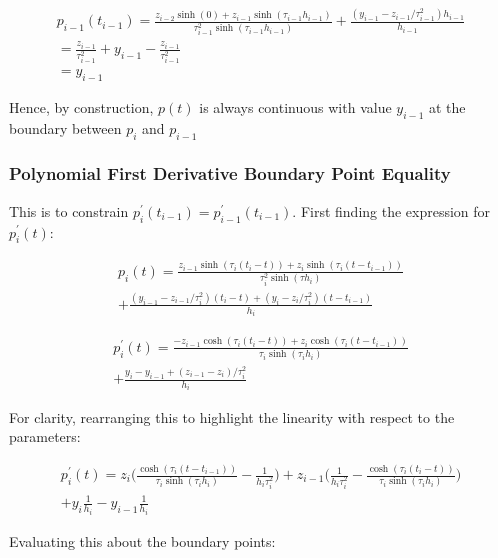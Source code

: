 \documentclass{article}
\begin{document}
\begin{eqnarray}
    \nonumber
    p_{i-1}(t_{i-1}) = \frac{z_{i-2} \sinh(0) + z_{i-1} \sinh(\tau_{i-1} h_{i-1})}{\tau_{i-1}^2 \sinh(\tau_{i-1} h_{i-1})}
    + \frac{(y_{i-1} - z_{i-1}/\tau_{i-1}^2) h_{i-1}}{h_{i-1}} \\
    \nonumber
    = \frac{z_{i-1}}{\tau_{i-1}^2} + y_{i-1} - \frac{z_{i-1}}{\tau_{i-1}^2} \\
    \nonumber
    = y_{i-1}
\end{eqnarray}

Hence, by construction, $p(t)$ is always continuous with value $y_{i-1}$ at the boundary
between $p_i$ and $p_{i - 1}$

\subsubsection{Polynomial First Derivative Boundary Point Equality}
This is to constrain $p^\prime_i(t_{i-1}) = p^\prime_{i-1}(t_{i-1})$. First finding the 
expression for $p^\prime_i(t)$:

\begin{multline}
    p_i(t) = \frac{z_{i-1} \sinh(\tau_i (t_i - t)) + z_i \sinh(\tau_i (t - t_{i-1}))}{\tau_i^2 \sinh(\tau h_i)}  \\
        + \frac{(y_{i-1} - z_{i-1}/\tau_i^2)(t_i - t) + (y_i - z_i/\tau_i^2)(t - t_{i-1})}{h_i}
\end{multline}

\begin{multline}
    p^\prime_i(t) = \frac{ -z_{i-1} \cosh(\tau_i (t_i - t)) + z_i \cosh(\tau_i (t - t_{i-1}))}{\tau_i \sinh(\tau_i h_i)}  \\
        + \frac{y_i - y_{i-1} +  (z_{i-1} - z_i)/\tau_i^2}{h_i}
\end{multline}

For clarity, rearranging this to highlight the linearity with respect to the parameters:

\begin{multline}
    p^\prime_i(t) = z_i \biggl( \frac{ \cosh(\tau_i (t - t_{i-1}))}{\tau_i \sinh(\tau_i h_i)} - \frac{1}{h_i \tau_i^2} \biggr) 
        + z_{i-1} \biggl( \frac{1}{h_i \tau_i^2} - \frac{ \cosh(\tau_i (t_i - t))}{\tau_i \sinh(\tau_i h_i)} \biggr)\\
        + y_i \frac{1}{h_i} - y_{i - 1} \frac{1}{h_i}
\end{multline}

Evaluating this about the boundary points:
\end{document}
